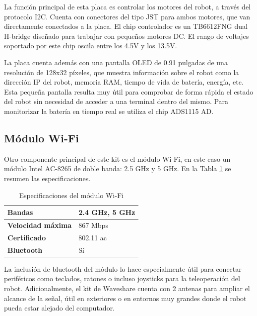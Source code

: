 La función principal de esta placa es controlar los motores del robot, a través del protocolo I2C. Cuenta con conectores del tipo JST para ambos motores, que van directamente conectados a la placa. El chip controlador es un TB6612FNG dual H-bridge diseñado para trabajar con pequeños motores DC. El rango de voltajes soportado por este chip oscila entre los 4.5V y los 13.5V.

La placa cuenta además con una pantalla OLED de 0.91 pulgadas de una resolución de 128x32 píxeles, que muestra información sobre el robot como la dirección IP del robot, memoria RAM, tiempo de vida de batería, energía, etc. Esta pequeña pantalla resulta muy útil para comprobar de forma rápida el estado del robot sin necesidad de acceder a una terminal dentro del mismo. Para monitorizar la batería en tiempo real se utiliza el chip ADS1115 AD.

\subsection{Módulo Wi-Fi}

Otro componente principal de este kit es el módulo Wi-Fi, en este caso un módulo Intel AC-8265 de doble banda: 2.5 GHz y 5 GHz. En la Tabla \ref{tab:wifi} se resumen las especificaciones.

\begin{table}[H]
\centering
\captionsetup[table]{name=New Table Name}

\begin{tabular}{l|l} \hline
\textbf{Bandas}\cellcolor[HTML]{EFEFEF} & 2.4 GHz, 5 GHz \\ \hline
\textbf{Velocidad máxima}\cellcolor[HTML]{EFEFEF} & 867 Mbps \\ \hline
\textbf{Certificado}\cellcolor[HTML]{EFEFEF} & 802.11 ac \\ \hline
\textbf{Bluetooth}\cellcolor[HTML]{EFEFEF} & Sí \\ \hline
\end{tabular}
\caption{Especificaciones del módulo Wi-Fi}
\label{tab:wifi}
\end{table}

La inclusión de bluetooth del módulo lo hace especialmente útil para conectar periféricos como teclados, ratones o incluso joysticks para la teleoperación del robot. Adicionalmente, el kit de Waveshare cuenta con 2 antenas para ampliar el alcance de la señal, útil en exteriores o en entornos muy grandes donde el robot pueda estar alejado del computador.

